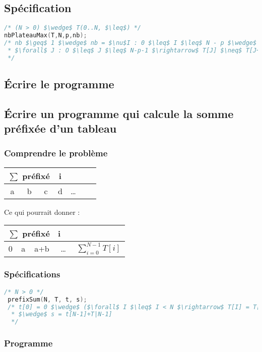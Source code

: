  \subsection{Spécification}
 \begin{lstlisting}[language=C]
/* (N > 0) $\wedge$ T(0..N, $\leq$) */
nbPlateauMax(T,N,p,nb);
/* nb $\geq$ 1 $\wedge$ nb = $\nu$I : 0 $\leq$ I $\leq$ N - p $\wedge$ T[I] = T[I+p-1] $\wedge$ 
 * $\forall$ J : O $\leq$ J $\leq$ N-p-1 $\rightarrow$ T[J] $\neq$ T[J+p] 
 */ 
 \end{lstlisting}
 \subsection{\'Ecrire le programme}
 

 \subsection{\'Ecrire un programme qui calcule la somme préfixée d'un tableau}
 \subsubsection{Comprendre le problème}
 \begin{tabular}{|c|c|c|c|c|c|}
	 \multicolumn{3}{|c|}{$\sum$ préfixé}&i\\
	 \hline
	 a & b & c&d&\ldots&~~\\
	 \hline
 \end{tabular}

  Ce qui pourrait donner : \\
 \begin{tabular}{|c|c|c|c|c|c|}
	 \multicolumn{3}{|c|}{$\sum$ préfixé}&i\\
	 \hline
	 0 & a & a+b&\multicolumn{2}{|c}{\ldots}&$\sum^{N-1}_{i=0}T[i]$\\
	 \hline
 \end{tabular}
 \subsubsection{Spécifications}
 \begin{lstlisting}[language=C]
 /* N > 0 */
 prefixSum(N, T, t, s);
 /* t[0] = 0 $\wedge$ ($\forall$ I $\leq$ I < N $\rightarrow$ T[I] = T[I-1] + T[I-1]) 
  * $\wedge$ s = t[N-1]+T|N-1]
  */
 \end{lstlisting}
 \subsubsection{Programme}
 
